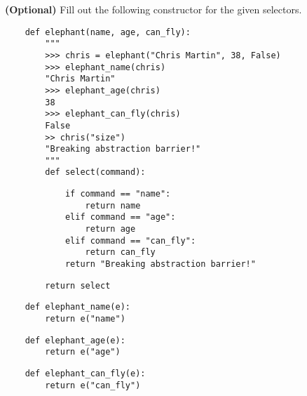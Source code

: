     \begin{blocksection}
    \question \textbf{(Optional)} Fill out the following constructor for the given
    selectors.
    
    \begin{lstlisting}
    def elephant(name, age, can_fly):
        """
        >>> chris = elephant("Chris Martin", 38, False)
        >>> elephant_name(chris)
        "Chris Martin"
        >>> elephant_age(chris)
        38
        >>> elephant_can_fly(chris)
        False
        >> chris("size")
        "Breaking abstraction barrier!"
        """
        def select(command):
    \end{lstlisting}
    \begin{solution}[1.8in]
    \begin{lstlisting}
            if command == "name":
                return name
            elif command == "age":
                return age
            elif command == "can_fly":
                return can_fly
            return "Breaking abstraction barrier!"
    \end{lstlisting}
    \end{solution}
    
    \begin{lstlisting}
        return select
    \end{lstlisting}
    
    \begin{lstlisting}
    def elephant_name(e):
        return e("name")
    \end{lstlisting}
    
    \begin{lstlisting}
    def elephant_age(e):
        return e("age")
    \end{lstlisting}
    
    \begin{lstlisting}
    def elephant_can_fly(e):
        return e("can_fly")
    \end{lstlisting}
    
    \end{blocksection}
    